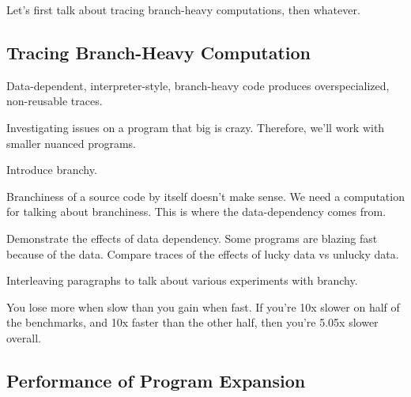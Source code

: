 		\begin{paragraph-here}
			Let's first talk about tracing branch-heavy computations, then whatever.
		\end{paragraph-here}

		\subsection{Tracing Branch-Heavy Computation}
			\begin{mainpoint}
				Data-dependent, interpreter-style, branch-heavy code produces overspecialized, non-reusable traces.
		\end{mainpoint}
			\label{section:branchy}

		\begin{paragraph-here}
			Investigating issues on a program that big is crazy. Therefore, we'll work with smaller nuanced programs.
		\end{paragraph-here}

		\begin{paragraph-here}
			Introduce branchy.
		\end{paragraph-here}

		\begin{paragraph-here}
			Branchiness of a source code by itself doesn't make sense. We need a computation for talking about branchiness. This is where the data-dependency comes from.
		\end{paragraph-here}

		\begin{show-experiment}
			Demonstrate the effects of data dependency. Some programs are blazing fast because of the data.
			Compare traces of the effects of lucky data vs unlucky data.
		\end{show-experiment}

		\begin{paragraph-here}
			Interleaving paragraphs to talk about various experiments with branchy.
		\end{paragraph-here}

		\begin{paragraph-here}
			You lose more when slow than you gain when fast. If you're 10x slower on half of the benchmarks, and 10x faster than the other half, then you're 5.05x slower overall.
		\end{paragraph-here}

		\subsection{Performance of Program Expansion}

